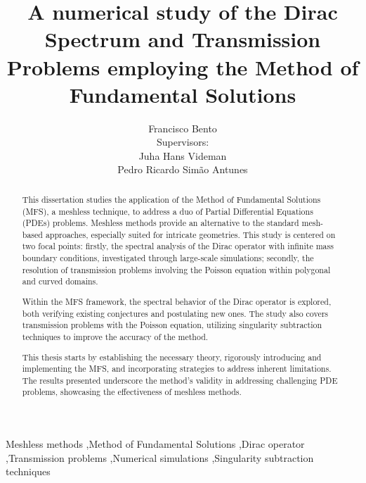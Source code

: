 \documentclass[5p,authoryear]{elsarticle}
\begin{document}
\begin{frontmatter}

\title{A numerical study of the Dirac Spectrum and Transmission Problems employing the Method of Fundamental Solutions}


\author{Francisco Bento \\ \small{\vspace{0.2cm} Supervisors: \\ \vspace{0.1cm} Juha Hans Videman \\ Pedro Ricardo Simão Antunes}}

\address{Instituto Superior Técnico - Lisboa, Portugal}

\begin{abstract}
This dissertation studies the application of the Method of Fundamental Solutions (MFS), a meshless technique, to address a duo of Partial Differential Equations (PDEs) problems. Meshless methods provide an alternative to the standard mesh-based approaches, especially suited for intricate geometries. This study is centered on two focal points: firstly, the spectral analysis of the Dirac operator with infinite mass boundary conditions, investigated through large-scale simulations; secondly, the resolution of transmission problems involving the Poisson equation within polygonal and curved domains.

Within the MFS framework, the spectral behavior of the Dirac operator is explored, both verifying existing conjectures and postulating new ones. The study also covers transmission problems with the Poisson equation, utilizing singularity subtraction techniques to improve the accuracy of the method.

This thesis starts by establishing the necessary theory, rigorously introducing and implementing the MFS, and incorporating strategies to address inherent limitations. The results presented underscore the method's validity in addressing challenging PDE problems, showcasing the effectiveness of meshless methods.
\end{abstract}

\begin{keyword}
    Meshless methods \sep Method of Fundamental Solutions \sep Dirac operator \sep Transmission problems \sep Numerical simulations \sep Singularity subtraction techniques
\end{keyword}

\end{frontmatter}
\end{document}
